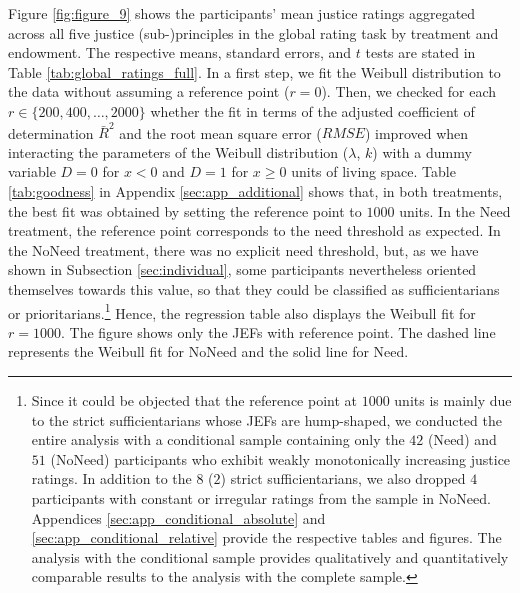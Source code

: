 \documentclass[12pt]{scrartcl}
\begin{document}
Figure \ref{fig:figure_9} shows the participants' mean justice ratings aggregated across all five justice (sub-)principles in the global rating task by treatment and endowment.
The respective means, standard errors, and $t$ tests are stated in Table \ref{tab:global_ratings_full}.
In a first step, we fit the Weibull distribution to the data without assuming a reference point ($r=0$).
Then, we checked for each $r\in\{200,400,\ldots,2000\}$ whether the fit in terms of the adjusted coefficient of determination $\bar{R}^2$ and the root mean square error ($RMSE$) improved when interacting the parameters of the Weibull distribution ($\lambda$, $k$) with a dummy variable $D=0$ for $x<0$ and $D=1$ for $x\ge0$ units of living space.
Table \ref{tab:goodness} in Appendix \ref{sec:app_additional} shows that, in both treatments, the best fit was obtained by setting the reference point to $1000$ units.
In the Need treatment, the reference point corresponds to the need threshold as expected.
In the NoNeed treatment, there was no explicit need threshold, but, as we have shown in Subsection \ref{sec:individual}, some participants nevertheless oriented themselves towards this value, so that they could be classified as sufficientarians or prioritarians.\footnote{Since it could be objected that the reference point at $1000$ units is mainly due to the strict sufficientarians whose JEFs are hump-shaped, we conducted the entire analysis with a conditional sample containing only the $42$ (Need) and $51$ (NoNeed) participants who exhibit weakly monotonically increasing justice ratings. In addition to the $8$ ($2$) strict sufficientarians, we also dropped $4$ participants with constant or irregular ratings from the sample in NoNeed. Appendices \ref{sec:app_conditional_absolute} and \ref{sec:app_conditional_relative} provide the respective tables and figures. The analysis with the conditional sample provides qualitatively and quantitatively comparable results to the analysis with the complete sample.}
Hence, the regression table also displays the Weibull fit for $r=1000$.
The figure shows only the JEFs with reference point.
The dashed line represents the Weibull fit for NoNeed and the solid line for Need.
\end{document}
